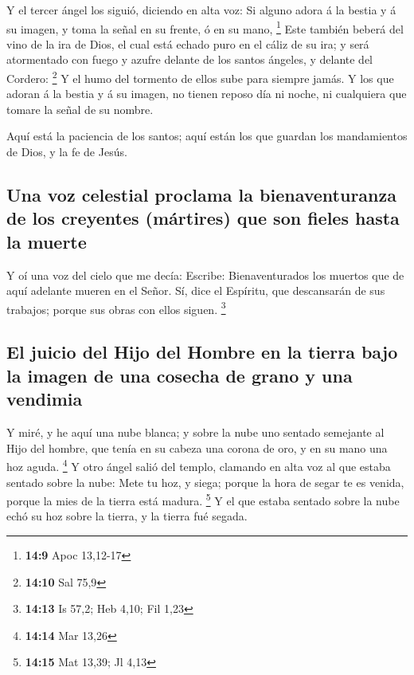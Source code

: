  Y el tercer ángel los siguió, diciendo en alta voz: Si
alguno adora á la bestia y á su imagen, y toma la señal en su frente, ó
en su mano, \footnote{\textbf{14:9} Apoc 13,12-17}  Este
también beberá del vino de la ira de Dios, el cual está echado puro en
el cáliz de su ira; y será atormentado con fuego y azufre delante de los
santos ángeles, y delante del Cordero: \footnote{\textbf{14:10} Sal 75,9}
 Y el humo del tormento de ellos sube para siempre jamás. Y
los que adoran á la bestia y á su imagen, no tienen reposo día ni noche,
ni cualquiera que tomare la señal de su nombre.

 Aquí está la paciencia de los santos; aquí están los que
guardan los mandamientos de Dios, y la fe de Jesús.

\hypertarget{una-voz-celestial-proclama-la-bienaventuranza-de-los-creyentes-muxe1rtires-que-son-fieles-hasta-la-muerte}{%
\subsection{Una voz celestial proclama la bienaventuranza de los
creyentes (mártires) que son fieles hasta la
muerte}\label{una-voz-celestial-proclama-la-bienaventuranza-de-los-creyentes-muxe1rtires-que-son-fieles-hasta-la-muerte}}

 Y oí una voz del cielo que me decía: Escribe:
Bienaventurados los muertos que de aquí adelante mueren en el Señor. Sí,
dice el Espíritu, que descansarán de sus trabajos; porque sus obras con
ellos siguen. \footnote{\textbf{14:13} Is 57,2; Heb 4,10; Fil 1,23}

\hypertarget{el-juicio-del-hijo-del-hombre-en-la-tierra-bajo-la-imagen-de-una-cosecha-de-grano-y-una-vendimia}{%
\subsection{El juicio del Hijo del Hombre en la tierra bajo la imagen de
una cosecha de grano y una
vendimia}\label{el-juicio-del-hijo-del-hombre-en-la-tierra-bajo-la-imagen-de-una-cosecha-de-grano-y-una-vendimia}}

 Y miré, y he aquí una nube blanca; y sobre la nube uno
sentado semejante al Hijo del hombre, que tenía en su cabeza una corona
de oro, y en su mano una hoz aguda. \footnote{\textbf{14:14} Mar 13,26}
 Y otro ángel salió del templo, clamando en alta voz al que
estaba sentado sobre la nube: Mete tu hoz, y siega; porque la hora de
segar te es venida, porque la mies de la tierra está madura. \footnote{\textbf{14:15}
  Mat 13,39; Jl 4,13}  Y el que estaba sentado sobre la
nube echó su hoz sobre la tierra, y la tierra fué segada.


